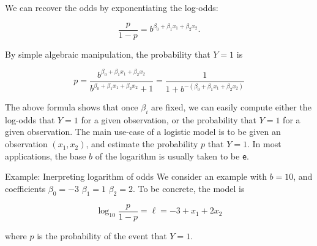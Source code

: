 \documentclass[11pt,dvipsnames,ignorenonframetext,aspectratio=169]{beamer}
\begin{document}
\begin{frame}[fragile]{}
\protect\hypertarget{section-4}{}
We can recover the odds by exponentiating the log-odds:

\[
{\displaystyle {\frac {p}{1-p}}=b^{\beta _{0}+\beta _{1}x_{1}+\beta _{2}x_{2}}}.
\]

By simple algebraic manipulation, the probability that
\({\displaystyle Y=1}\) is

\[
{\displaystyle p={\frac {b^{\beta _{0}+\beta _{1}x_{1}+\beta _{2}x_{2}}}{b^{\beta _{0}+\beta _{1}x_{1}+\beta _{2}x_{2}}+1}}={\frac {1}{1+b^{-(\beta _{0}+\beta _{1}x_{1}+\beta _{2}x_{2})}}}}
\]

The above formula shows that once \({\displaystyle \beta _{i}}\) are
fixed, we can easily compute either the log-odds that
\({\displaystyle Y=1}\) for a given observation, or the probability that
\({\displaystyle Y=1}\) for a given observation. The main use-case of a
logistic model is to be given an observation
\({\displaystyle (x_{1},x_{2})}\), and estimate the probability
\({\displaystyle p}\) that \({\displaystyle Y=1}\). In most
applications, the base \({\displaystyle b}\) of the logarithm is usually
taken to be \texttt{e}.
\end{frame}

\begin{frame}{Example: Inerpreting logarithm of odds}
\protect\hypertarget{example-inerpreting-logarithm-of-odds}{}
We consider an example with \({\displaystyle b=10}\), and coefficients
\({\displaystyle \beta _{0}=-3}\) \({\displaystyle \beta _{1}=1}\)
\({\displaystyle \beta _{2}=2}\). To be concrete, the model is

\[
{\displaystyle \log _{10}{\frac {p}{1-p}}=\ell =-3+x_{1}+2x_{2}}
\]

where \({\displaystyle p}\) is the probability of the event that
\({\displaystyle Y=1}\).
\end{frame}
\end{document}
